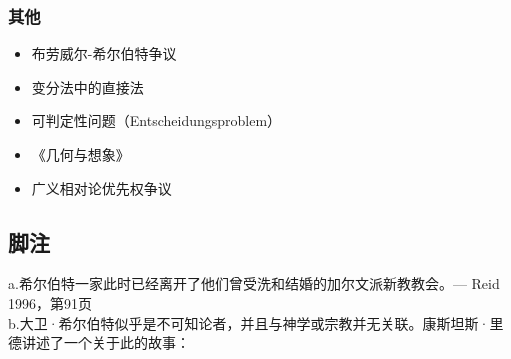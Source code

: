\subsubsection{其他}
\begin{itemize}
\item 布劳威尔-希尔伯特争议
\item 变分法中的直接法
\item 可判定性问题（Entscheidungsproblem）
\item 《几何与想象》
\item 广义相对论优先权争议
\end{itemize}
\subsection{脚注}

a.希尔伯特一家此时已经离开了他们曾受洗和结婚的加尔文派新教教会。— Reid 1996，第91页\\
b.大卫·希尔伯特似乎是不可知论者，并且与神学或宗教并无关联。康斯坦斯·里德讲述了一个关于此的故事：

